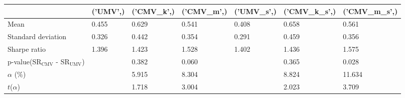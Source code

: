 \begin{tabular}{lllllll}
\toprule
 & ('UMV',) & ('CMV_k',) & ('CMV_m',) & ('UMV_s',) & ('CMV_k_s',) & ('CMV_m_s',) \\
\midrule
Mean & 0.455 & 0.629 & 0.541 & 0.408 & 0.658 & 0.561 \\
Standard deviation & 0.326 & 0.442 & 0.354 & 0.291 & 0.459 & 0.356 \\
Sharpe ratio & 1.396 & 1.423 & 1.528 & 1.402 & 1.436 & 1.575 \\
p-value(SR$_{\text{CMV}}$ - SR$_{\text{UMV}}$) &  & 0.382 & 0.060 &  & 0.365 & 0.028 \\
$\alpha$ (\%) &  & 5.915 & 8.304 &  & 8.824 & 11.634 \\
$t$($\alpha$) &  & 1.718 & 3.004 &  & 2.023 & 3.709 \\
\bottomrule
\end{tabular}
